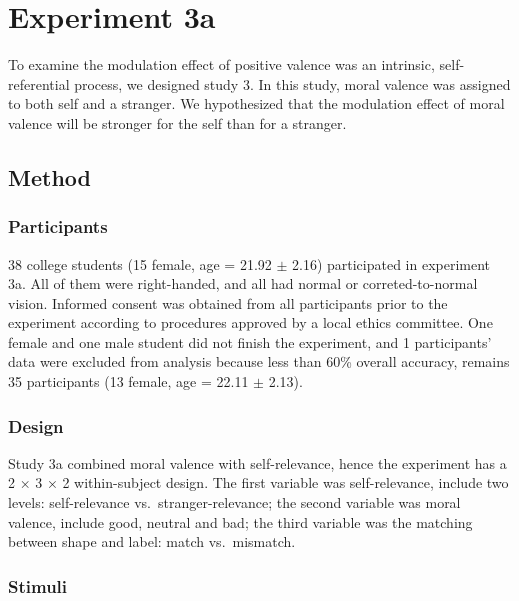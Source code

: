 \documentclass[man]{apa6}
\begin{document}
\hypertarget{experiment-3a}{%
\section{Experiment 3a}\label{experiment-3a}}

To examine the modulation effect of positive valence was an intrinsic, self-referential process, we designed study 3. In this study, moral valence was assigned to both self and a stranger. We hypothesized that the modulation effect of moral valence will be stronger for the self than for a stranger.

\hypertarget{method-3}{%
\subsection{Method}\label{method-3}}

\hypertarget{participants-4}{%
\subsubsection{Participants}\label{participants-4}}

38 college students (15 female, age = 21.92 \(\pm\) 2.16) participated in experiment 3a. All of them were right-handed, and all had normal or correted-to-normal vision. Informed consent was obtained from all participants prior to the experiment according to procedures approved by a local ethics committee. One female and one male student did not finish the experiment, and 1 participants' data were excluded from analysis because less than 60\% overall accuracy, remains 35 participants (13 female, age = 22.11 \(\pm\) 2.13).

\hypertarget{design}{%
\subsubsection{Design}\label{design}}

Study 3a combined moral valence with self-relevance, hence the experiment has a 2 × 3 × 2 within-subject design. The first variable was self-relevance, include two levels: self-relevance vs.~stranger-relevance; the second variable was moral valence, include good, neutral and bad; the third variable was the matching between shape and label: match vs.~mismatch.

\hypertarget{stimuli}{%
\subsubsection{Stimuli}\label{stimuli}}
\end{document}
